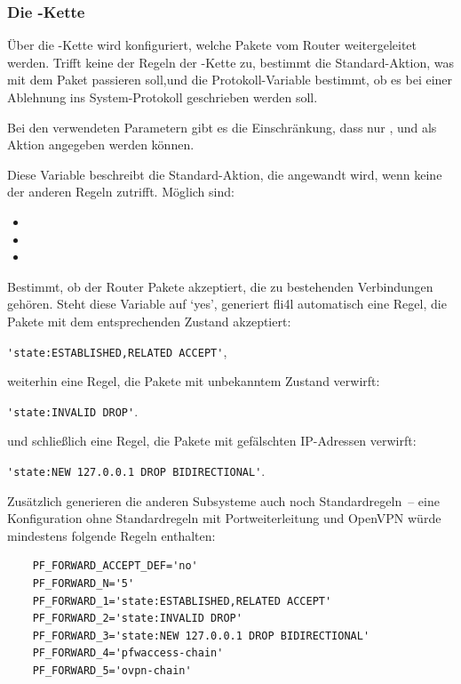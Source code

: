 \subsubsection{Die -Kette}

Über die -Kette wird konfiguriert, welche Pakete vom Router
weitergeleitet werden. Trifft keine der Regeln der -Kette zu,
bestimmt die Standard-Aktion, was mit dem Paket passieren soll,und die
Protokoll-Variable bestimmt, ob es bei einer Ablehnung ins System-Protokoll
geschrieben werden soll.

Bei den verwendeten Parametern gibt es die Einschränkung, dass nur
,  und  als Aktion angegeben
werden können.

\begin{description}
Diese Variable beschreibt die Standard-Aktion, die angewandt wird,
wenn keine der anderen Regeln zutrifft. Möglich sind:

\begin{itemize}
\item {}
\item {}
\item {}
\end{itemize}

Bestimmt, ob der Router Pakete akzeptiert, die zu bestehenden
Verbindungen gehören. Steht diese Variable auf `yes', generiert fli4l
automatisch eine Regel, die Pakete mit dem entsprechenden Zustand
akzeptiert:

\verb+'state:ESTABLISHED,RELATED ACCEPT'+,

weiterhin eine Regel, die Pakete mit unbekanntem Zustand verwirft:

\verb+'state:INVALID DROP'+.

und schließlich eine Regel, die Pakete mit gefälschten IP-Adressen verwirft:

\verb+'state:NEW 127.0.0.1 DROP BIDIRECTIONAL'+.

Zusätzlich generieren die
anderen Subsysteme auch noch Standardregeln~-- eine Konfiguration ohne
Standardregeln mit Portweiterleitung und OpenVPN würde mindestens
folgende Regeln enthalten:

\begin{example}
\begin{verbatim}
    PF_FORWARD_ACCEPT_DEF='no'
    PF_FORWARD_N='5'
    PF_FORWARD_1='state:ESTABLISHED,RELATED ACCEPT'
    PF_FORWARD_2='state:INVALID DROP'
    PF_FORWARD_3='state:NEW 127.0.0.1 DROP BIDIRECTIONAL'
    PF_FORWARD_4='pfwaccess-chain'
    PF_FORWARD_5='ovpn-chain'
\end{verbatim}
\end{example}


\end{description}
